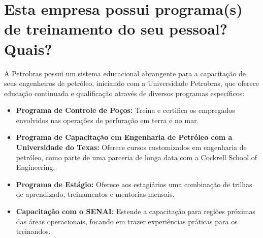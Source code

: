 \section{Esta empresa possui programa(s) de treinamento do seu pessoal? Quais?}

A Petrobras possui um sistema educacional abrangente para a capacitação de seus engenheiros de petróleo, iniciando com a Universidade Petrobras, que oferece educação continuada e qualificação através de diversos programas específicos:

\begin{itemize}
    \item \textbf{Programa de Controle de Poços:} Treina e certifica os empregados envolvidos nas operações de perfuração em terra e no mar.
    \item \textbf{Programa de Capacitação em Engenharia de Petróleo com a Universidade do Texas:} Oferece cursos customizados em engenharia de petróleo, como parte de uma parceria de longa data com a Cockrell School of Engineering.
    \item \textbf{Programa de Estágio:} Oferece aos estagiários uma combinação de trilhas de aprendizado, treinamentos e mentorias mensais.
    \item \textbf{Capacitação com o SENAI:} Estende a capacitação para regiões próximas das áreas operacionais, focando em trazer experiências práticas para os treinandos.
\end{itemize}

